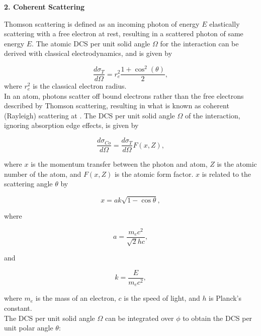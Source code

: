 \documentclass[%
 aip,
cp,  %
 amsmath,amssymb,%
reprint,%
]{revtex4-2}
\begin{document}
\begin{large}
    \bf{2. Coherent Scattering}
\end{large}

\par Thomson scattering is defined as an incoming photon of energy $E$ elastically scattering with a free electron at rest, resulting in a scattered photon of same energy $E$. The atomic DCS per unit solid angle $\Omega$ for the interaction can be derived with classical electrodynamics, and is given by

\begin{equation}
    \frac{d\sigma_T}{d\Omega} = r_e^2 \frac{1 + \cos^2(\theta)}{2},
\end{equation}
where $r_e^2$ is the classical electron radius. \\
In an atom, photons scatter off bound electrons rather than the free electrons described by Thomson scattering, resulting in what is known as coherent (Rayleigh) scattering at . The DCS per unit solid angle $\Omega$ of the interaction, ignoring absorption edge effects, is given by

\begin{equation}
    \frac{d\sigma_{Co}}{d\Omega} = \frac{d\sigma_T}{d\Omega} F(x, Z),
\end{equation}

where $x$ is the momentum transfer between the photon and atom, $Z$ is the atomic number of the atom, and $F(x, Z)$ is the atomic form factor. $x$ is related to the scattering angle $\theta$ by


\begin{equation}
    x = ak\sqrt{1 - \cos\theta},
\end{equation}

where

\begin{equation}
    a = \frac{m_e c^2}{\sqrt{2}hc},
\end{equation}

and

\begin{equation}
    k = \frac{E}{m_e c^2},
\end{equation}

where $m_e$ is the mass of an electron, $c$ is the speed of light, and $h$ is Planck's constant. \\

The DCS per unit solid angle $\Omega$ can be integrated over $\phi$ to obtain the DCS per unit polar angle $\theta$:
\end{document}
